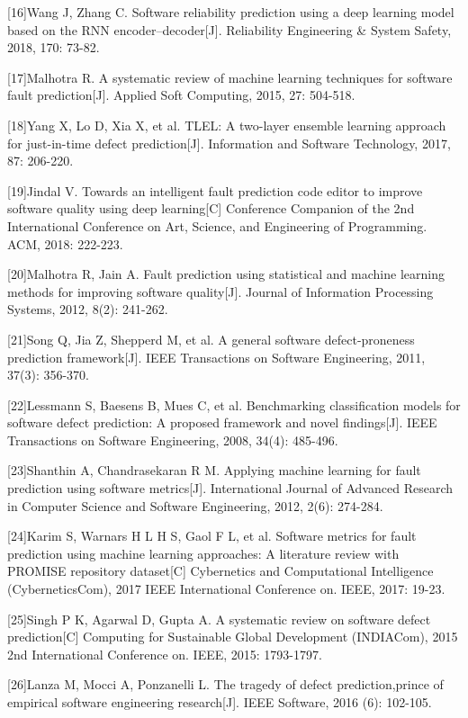 \documentclass[12pt, a4paper]{article}
\begin{document}
[16]Wang J, Zhang C. Software reliability prediction using a deep learning model based on the RNN encoder–decoder[J]. Reliability Engineering \& System Safety, 2018, 170: 73-82.

[17]Malhotra  R.  A  systematic  review  of  machine  learning  techniques  for software fault prediction[J]. Applied Soft Computing, 2015, 27: 504-518.

[18]Yang X, Lo D, Xia X, et al. TLEL: A two-layer ensemble learning approach for just-in-time defect prediction[J]. Information and Software Technology, 2017, 87: 206-220.

[19]Jindal V. Towards an intelligent fault prediction code editor to improve software quality using deep learning[C] Conference Companion of the 2nd International Conference on Art, Science, and Engineering of Programming. ACM, 2018: 222-223.

[20]Malhotra R, Jain A. Fault prediction using statistical and machine learning methods  for  improving  software  quality[J].  Journal  of  Information Processing Systems, 2012, 8(2): 241-262.

[21]Song Q, Jia Z, Shepperd M, et al. A general software defect-proneness prediction framework[J]. IEEE Transactions on Software Engineering, 2011, 37(3): 356-370.

[22]Lessmann S, Baesens B, Mues C, et al. Benchmarking classification models for software defect prediction: A proposed framework and novel findings[J]. IEEE Transactions on Software Engineering, 2008, 34(4): 485-496.

[23]Shanthin A,  Chandrasekaran R  M. Applying  machine  learning  for  fault prediction  using  software  metrics[J].  International  Journal  of Advanced Research in Computer Science and Software Engineering, 2012, 2(6): 274-284.

[24]Karim S, Warnars H L H S, Gaol F L, et al. Software metrics for fault prediction  using  machine  learning  approaches: A  literature  review  with PROMISE  repository  dataset[C] Cybernetics  and  Computational Intelligence (CyberneticsCom),  2017  IEEE  International  Conference  on. IEEE, 2017: 19-23.

[25]Singh P K, Agarwal D, Gupta A. A systematic review on software defect prediction[C] Computing   for   Sustainable   Global   Development (INDIACom), 2015 2nd International Conference on. IEEE, 2015: 1793-1797.

[26]Lanza M, Mocci A, Ponzanelli L. The tragedy of defect prediction,prince of empirical software engineering research[J]. IEEE Software, 2016 (6): 102-105.
\end{document}
